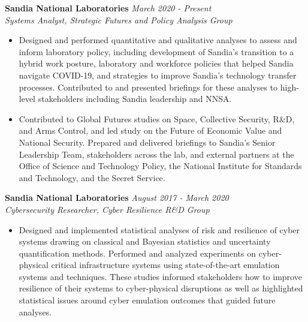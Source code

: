 \documentclass[11pt]{article}
\newenvironment{changemargin}[2]{%
  \begin{list}{}{%
    \setlength{\topsep}{0pt}%
    \setlength{\leftmargin}{#1}%
    \setlength{\rightmargin}{#2}%
    \setlength{\listparindent}{\parindent}%
    \setlength{\itemindent}{\parindent}%
    \setlength{\parsep}{\parskip}%
  }%
  \item[]}{\end{list}
}
\newenvironment{body} {
	\vspace*{-16pt}
	\begin{changemargin}{-0.25in}{-0.5in}
  }	
	{\end{changemargin}
}
\begin{document}
\begin{body}
	\vspace{12pt}
	
	\textbf{Sandia National Laboratories} \hfill \emph{March 2020 - Present}\\
	\emph{Systems Analyst, Strategic Futures and Policy Analysis Group}
	\vspace*{-4pt}
	\begin{itemize}
		\item Designed and performed quantitative and qualitative analyses to assess and inform laboratory policy, including development of Sandia's transition to a hybrid work posture, laboratory and workforce policies that helped Sandia navigate COVID-19, and strategies to improve Sandia's technology transfer processes. Contributed to and presented briefings for these analyses to high-level stakeholders including Sandia leadership and NNSA.
		\item Contributed to Global Futures studies on Space, Collective Security, R\&D, and Arms Control, and led study on the Future of Economic Value and National Security. Prepared and delivered briefings to Sandia's Senior Leadership Team, stakeholders across the lab, and external partners at the Office of Science and Technology Policy, the National Institute for Standards and Technology, and the Secret Service.
	\end{itemize}	
	
	\textbf{Sandia National Laboratories} \hfill \emph{August 2017 - March 2020}\\
	\emph{Cybersecurity Researcher, Cyber Resilience R\&D Group}
	\vspace*{-4pt}
	\begin{itemize}
		\item Designed and implemented statistical analyses of risk and resilience of cyber systems drawing on classical and Bayesian statistics and uncertainty quantification methods. Performed and analyzed experiments on cyber-physical critical infrastructure systems using state-of-the-art emulation systems and techniques. These studies informed stakeholders how to improve resilience of their systems to cyber-physical disruptions as well as highlighted statistical issues around cyber emulation outcomes that guided future analyses.
	\end{itemize}	
	
	

\end{body}
\end{document}
